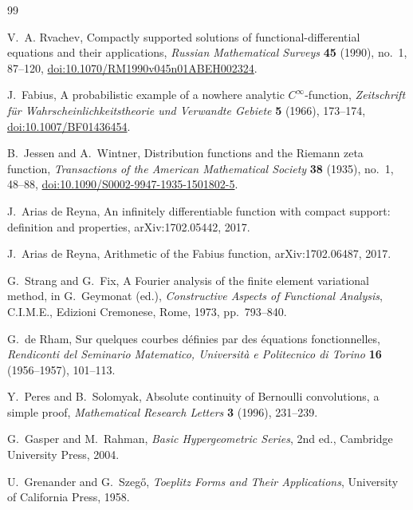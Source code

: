 \documentclass[11pt,oneside]{article}
\theoremstyle{definition}
\theoremstyle{remark}
\begin{document}
\begin{thebibliography}{99}

V.~A. Rvachev,
\newblock Compactly supported solutions of functional-differential equations and their applications,
\newblock \emph{Russian Mathematical Surveys} \textbf{45} (1990), no.~1, 87--120,
\newblock \href{https://doi.org/10.1070/RM1990v045n01ABEH002324}{doi:10.1070/RM1990v045n01ABEH002324}.

J.~Fabius,
\newblock A probabilistic example of a nowhere analytic \(C^\infty\)-function,
\newblock \emph{Zeitschrift f\"ur Wahrscheinlichkeitstheorie und Verwandte Gebiete} \textbf{5} (1966), 173--174,
\newblock \href{https://doi.org/10.1007/BF01436454}{doi:10.1007/BF01436454}.

B.~Jessen and A.~Wintner,
\newblock Distribution functions and the Riemann zeta function,
\newblock \emph{Transactions of the American Mathematical Society} \textbf{38} (1935), no.~1, 48--88,
\newblock \href{https://doi.org/10.1090/S0002-9947-1935-1501802-5}{doi:10.1090/S0002-9947-1935-1501802-5}.

J.~Arias de Reyna,
\newblock An infinitely differentiable function with compact support: definition and properties,
\newblock arXiv:1702.05442, 2017.

J.~Arias de Reyna,
\newblock Arithmetic of the Fabius function,
\newblock arXiv:1702.06487, 2017.

G.~Strang and G.~Fix,
\newblock A Fourier analysis of the finite element variational method,
\newblock in G.~Geymonat (ed.), \emph{Constructive Aspects of Functional Analysis}, C.I.M.E., Edizioni Cremonese, Rome, 1973, pp.~793--840.

G.~de Rham,
\newblock Sur quelques courbes d\'efinies par des \'equations fonctionnelles,
\newblock \emph{Rendiconti del Seminario Matematico, Universit\`a e Politecnico di Torino} \textbf{16} (1956--1957), 101--113.

Y.~Peres and B.~Solomyak,
\newblock Absolute continuity of Bernoulli convolutions, a simple proof,
\newblock \emph{Mathematical Research Letters} \textbf{3} (1996), 231--239.

G.~Gasper and M.~Rahman,
\newblock \emph{Basic Hypergeometric Series}, 2nd ed.,
\newblock Cambridge University Press, 2004.

U.~Grenander and G.~Szeg\H{o},
\newblock \emph{Toeplitz Forms and Their Applications},
\newblock University of California Press, 1958.


\end{thebibliography}
\end{document}
